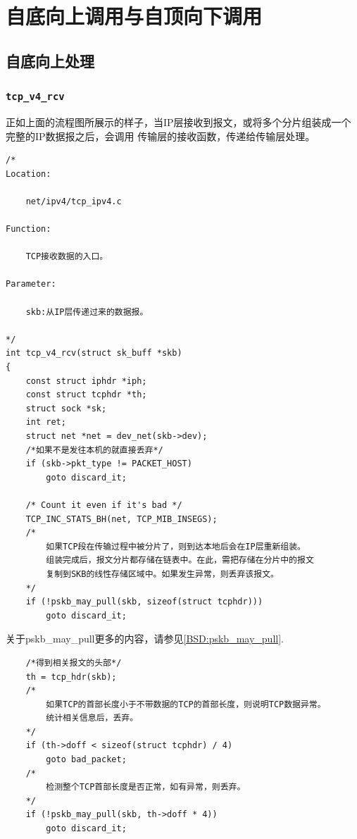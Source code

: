     \section{自底向上调用与自顶向下调用}
        \subsection{自底向上处理}
            \subsubsection{\texttt{tcp_v4_rcv}}
                \label{TCPReceive:tcp_v4_rcv}
                正如上面的流程图所展示的样子，当IP层接收到报文，或将多个分片组装成一个完整的IP数据报之后，会调用
                传输层的接收函数，传递给传输层处理。
\begin{verbatim}
/*
Location:

    net/ipv4/tcp_ipv4.c

Function:

    TCP接收数据的入口。

Parameter:

    skb:从IP层传递过来的数据报。

*/
int tcp_v4_rcv(struct sk_buff *skb)
{
    const struct iphdr *iph;
    const struct tcphdr *th;
    struct sock *sk;
    int ret;
    struct net *net = dev_net(skb->dev);
    /*如果不是发往本机的就直接丢弃*/
    if (skb->pkt_type != PACKET_HOST)
        goto discard_it;

    /* Count it even if it's bad */
    TCP_INC_STATS_BH(net, TCP_MIB_INSEGS);
    /*
        如果TCP段在传输过程中被分片了，则到达本地后会在IP层重新组装。
        组装完成后，报文分片都存储在链表中。在此，需把存储在分片中的报文
        复制到SKB的线性存储区域中。如果发生异常，则丢弃该报文。
    */
    if (!pskb_may_pull(skb, sizeof(struct tcphdr)))
        goto discard_it;
\end{verbatim}

    关于pskb\_may\_pull更多的内容，请参见\ref{BSD:pskb_may_pull}.

\begin{verbatim}
    /*得到相关报文的头部*/
    th = tcp_hdr(skb);
    /*
        如果TCP的首部长度小于不带数据的TCP的首部长度，则说明TCP数据异常。
        统计相关信息后，丢弃。
    */
    if (th->doff < sizeof(struct tcphdr) / 4)
        goto bad_packet;
    /*
        检测整个TCP首部长度是否正常，如有异常，则丢弃。
    */  
    if (!pskb_may_pull(skb, th->doff * 4))
        goto discard_it;
\end{verbatim}

